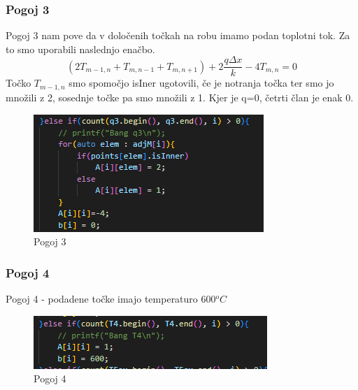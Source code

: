 \documentclass[12pt]{article}
\begin{document}
    \subsubsection{Pogoj 3}
        Pogoj 3 nam pove da v določenih točkah na robu imamo podan toplotni tok. Za to smo uporabili naslednjo enačbo. 
        $$(2T_{m-1,n}+T_{m,n-1}+T_{m,n+1})+2\frac{q\Delta x}{k}-4T_{m,n}=0$$
        Točko \(T_{m-1,n}\) smo spomočjo isIner ugotovili, če je notranja točka ter smo jo množili z 2, sosednje točke pa smo množili z 1. Kjer je q=0, četrti član je enak 0.
            \begin{figure}[ht]
                \centering
                \includegraphics[width=0.5\linewidth]{pogoj3.png}
                \renewcommand*\figurename{Slika}
                \caption{Pogoj 3}
                \label{Slika:7}
            \end{figure}
    \FloatBarrier
    \subsubsection{Pogoj 4}
         Pogoj 4 - podadene točke imajo temperaturo 600$^oC$
        \begin{figure}[ht]
            \centering
            \includegraphics[width=0.7\linewidth]{pogoj4.png}
            \renewcommand*\figurename{Slika}
            \caption{Pogoj 4}
            \label{Slika:8}
        \end{figure}
\newpage
        \FloatBarrier
\end{document}
